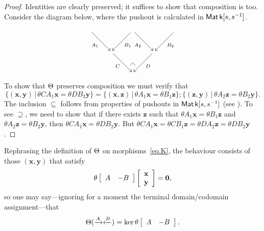 \begin{proof}
Identities are clearly preserved; it suffices to show that composition is too.
Consider the diagram below, where the pushout is calculated in $\operatorname{\mathsf{Mat}}{\mathsf{k}[s,s^{-1}]}$.
\[
\xymatrix{
  {}\ar[dr]_{A_1} & & \ar[dl]^{B_1}  
  \ar[dr]_{A_2} & & \ar[dl]^{B_2} {} 
 \\
& \ar[dr]_{C} & & \ar[dl]^{D}  \\
& & {\save*!<0cm,-.5cm>[dl]@^{|-}\restore}
}
\]
To show that $\Theta$ preserves composition we must verify that 
\[
  \{(\mathbf{x},\mathbf{y})\,|\, \theta CA_1\mathbf{x} = \theta DB_2\mathbf{y}\} =
  \{(\mathbf{x},\mathbf{z})\,|\, \theta A_1\mathbf{x} = \theta B_1\mathbf{z}\} ; 
  \{(\mathbf{z},\mathbf{y})\,|\, \theta A_2\mathbf{z} = \theta B_2\mathbf{y}\}.
\]
The inclusion $\subseteq$ follows from properties of pushouts in $\operatorname{\mathsf{Mat}}{\mathsf{k}[s,s^{-1}]}$ (see
\cite[Proposition 5.7]{BSZ2}).  To see $\supseteq$, we need to show that if there
exists $\mathbf{z}$ such that $\theta A_1\mathbf{x} = \theta B_1\mathbf{z}$ and
$\theta A_2\mathbf{z} = \theta B_2\mathbf{y}$, then $\theta CA_1\mathbf{x} =
\theta DB_2\mathbf{y}$.  But $\theta CA_1\mathbf{x}=\theta CB_1\mathbf{z}=\theta
DA_2\mathbf{z}=\theta DB_2\mathbf{y}$.
\end{proof}




Rephrasing the definition of $\Theta$ on morphisms~\eqref{eq.K}, the
behaviour consists of those $(\mathbf{x},\mathbf{y})$ that satisfy
\[
  \theta\left[\begin{array}{cc} A & -B\end{array}\right]
  \left[\begin{array}{c}\mathbf{x}\\\mathbf{y}\end{array}\right] 
  = \mathbf{0},
\]
so one may say---ignoring for a moment the terminal domain/codomain assignment---that 
\[ 
  \Theta (\xrightarrow{A}\xleftarrow{B}) = \ker \theta\left[
  \begin{array}{cc} A & -B\end{array}\right].
\]


